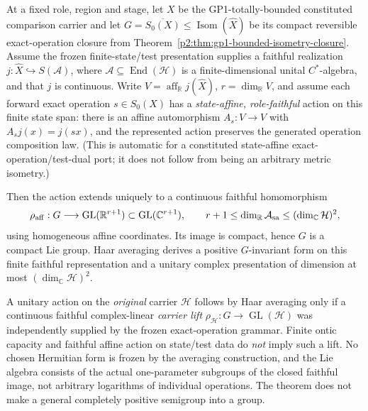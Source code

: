 \documentclass[12pt,a4paper]{article}
\begin{document}
\begin{theorem}
\label{p2:thm:frc-automatic-compact-lie-closure}
At a fixed role, region and stage, let \(X\) be the GP1-totally-bounded
constituted comparison carrier and let
\(G=\overline{S_0(X)}\leq\operatorname{Isom}(\widehat X)\)
be its compact reversible exact-operation closure from
Theorem~\ref{p2:thm:gp1-bounded-isometry-closure}.
Assume the frozen finite-state/test presentation supplies a faithful
realization \(j:\widehat X\hookrightarrow S(\mathcal A)\), where
\(\mathcal A\subseteq\operatorname{End}(\mathcal H)\) is a
finite-dimensional unital \(C^*\)-algebra, and that \(j\) is continuous.
Write \(V=\operatorname{aff}_{\mathbb R}j(\widehat X)\),
\(r=\dim_{\mathbb R}V\), and assume each forward exact operation
\(s\in S_0(X)\) has a \emph{state-affine, role-faithful} action on this
finite state span: there is an affine automorphism \(A_s:V\to V\) with
\(A_s j(x)=j(sx)\), and the represented action preserves the generated
operation composition law.  (This is automatic for a constituted
state-affine exact-operation/test-dual port; it does not follow from
being an arbitrary metric isometry.)

Then the action extends uniquely to a continuous faithful homomorphism
\[
 \rho_{\rm aff}:G\longrightarrow
 \operatorname{GL}(\mathbb R^{r+1})
 \subset\operatorname{GL}(\mathbb C^{r+1}),
 \qquad r+1\leq\dim_{\mathbb R}\mathcal A_{\rm sa}
 \leq(\dim_{\mathbb C}\mathcal H)^2,
\]
using homogeneous affine coordinates.  Its image is compact, hence
\(G\) is a compact Lie group.  Haar averaging derives a positive
\(G\)-invariant form on this finite faithful representation and a
unitary complex presentation of dimension at most
\((\dim_{\mathbb C}\mathcal H)^2\).

A unitary action on the \emph{original} carrier \(\mathcal H\) follows
by Haar averaging only if a continuous faithful complex-linear
\emph{carrier lift}
\(\rho_{\mathcal H}:G\to\operatorname{GL}(\mathcal H)\)
was independently supplied by the frozen exact-operation grammar.
Finite ontic capacity and faithful affine action on state/test data do
\emph{not} imply such a lift.  No chosen Hermitian form is frozen by the
averaging construction, and the Lie algebra consists of the actual
one-parameter subgroups of the closed faithful image, not arbitrary
logarithms of individual operations.  The theorem does not make a
general completely positive semigroup into a group.
\end{theorem}
\end{document}
